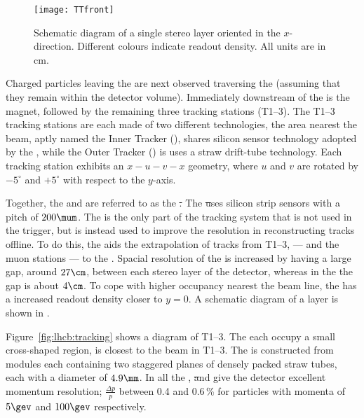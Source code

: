 \begin{figure}
  \begin{center}
    \texttt{[image: TTfront]}
    \caption[\lhcb TT]
    {\small
      Schematic diagram of a single stereo \ttracker layer oriented in the $x$-direction.
      Different colours indicate readout density.
      All units are in cm.
    }
    \label{fig:lhcb:tt}
  \end{center}
\end{figure}

Charged particles leaving the \velo are next observed traversing the \ttracker (assuming that they
remain within the \lhcb detector volume).
Immediately downstream of the \ttracker is the \lhcb magnet, followed by the remaining three
tracking stations (T1--3).
The T1--3 tracking stations are each made of two different technologies, the area nearest the beam,
aptly named the Inner Tracker (\intr), shares silicon sensor technology adopted by the \ttracker,
while the Outer Tracker (\ot) is uses a straw drift-tube technology.
Each tracking station exhibits an $x-u-v-x$ geometry, where $u$ and $v$ are rotated by $-5^\circ$ and
$+5^\circ$ with respect to the $y$-axis.

Together, the \ttracker and \intr are referred to as the \st.
The \st uses silicon strip sensors with a pitch of $200\mum$.
The \ttracker is the only part of the tracking system that is not used in the trigger, but is
instead used to improve the resolution in reconstructing tracks offline.
To do this, the \ttracker aids the extrapolation of tracks from T1--3, --- and the muon stations
--- to the \velo.
Spacial resolution of the \ttracker is increased by having a large gap, around $27\cm$, between
each stereo layer of the detector, whereas in the \intr the gap is about $4\cm$.
To cope with higher occupancy nearest the beam line, the \ttracker has a increased readout density
closer to $y=0$.
A schematic diagram of a \ttracker layer is shown in .

Figure~\ref{fig:lhcb:tracking} shows a diagram of T1--3.
The  each occupy a small cross-shaped region, is closest to the beam in T1--3.
The \ot is constructed from modules each containing two staggered planes of densely packed straw
tubes, each with a diameter of  $4.9\mm$.
In all the \velo, \st and \ot give the \lhcb detector excellent momentum resolution;
$\tfrac{\Delta p}{p}$ between 0.4 and 0.6\,\% for particles with momenta of $5\gev$ and $100\gev$
respectively.

